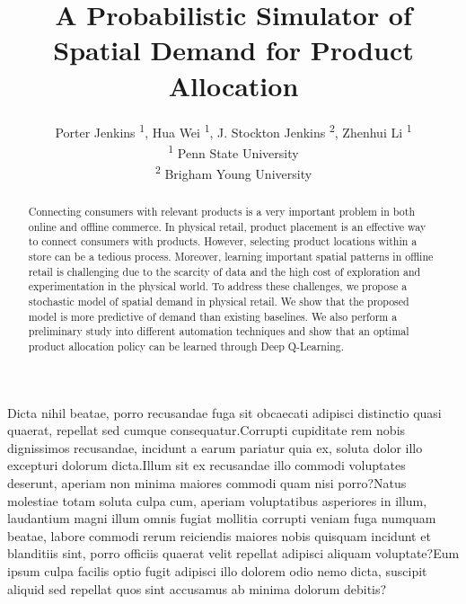\documentclass[letterpaper]{article}
\title{A Probabilistic Simulator of Spatial Demand for Product Allocation}
\author{Porter Jenkins \textsuperscript{\rm 1}, Hua Wei \textsuperscript{\rm 1}, J. Stockton Jenkins \textsuperscript{\rm 2}, Zhenhui Li \textsuperscript{\rm 1} \\
\textsuperscript{\rm 1} Penn State University \\
\textsuperscript{\rm 2} Brigham Young University \\%
}
\begin{document}
\maketitle

\begin{abstract}
Connecting consumers with relevant products is a very important problem in both online and offline commerce. In physical retail, product placement is an effective way to connect consumers with products. However, selecting product locations within a store can be a tedious process. Moreover, learning important spatial patterns in offline retail is challenging due to the scarcity of data and the high cost of exploration and experimentation in the physical world. To address these challenges, we propose a stochastic model of spatial demand in physical retail. We show that the proposed model is more predictive of demand than existing baselines. We also perform a preliminary study into different automation techniques and show that an optimal product allocation policy can be learned through Deep Q-Learning.

\end{abstract}











Dicta nihil beatae, porro recusandae fuga sit obcaecati adipisci distinctio quasi quaerat, repellat sed cumque consequatur.Corrupti cupiditate rem nobis dignissimos recusandae, incidunt a earum pariatur quia ex, soluta dolor illo excepturi dolorum dicta.Illum sit ex recusandae illo commodi voluptates deserunt, aperiam non minima maiores commodi quam nisi porro?Natus molestiae totam soluta culpa cum, aperiam voluptatibus asperiores in illum, laudantium magni illum omnis fugiat mollitia corrupti veniam fuga numquam beatae, labore commodi rerum reiciendis maiores nobis quisquam incidunt et blanditiis sint, porro officiis quaerat velit repellat adipisci aliquam voluptate?Eum ipsum culpa facilis optio fugit adipisci illo dolorem odio nemo dicta, suscipit aliquid sed repellat quos sint accusamus ab minima dolorum debitis?\clearpage

\end{document}
